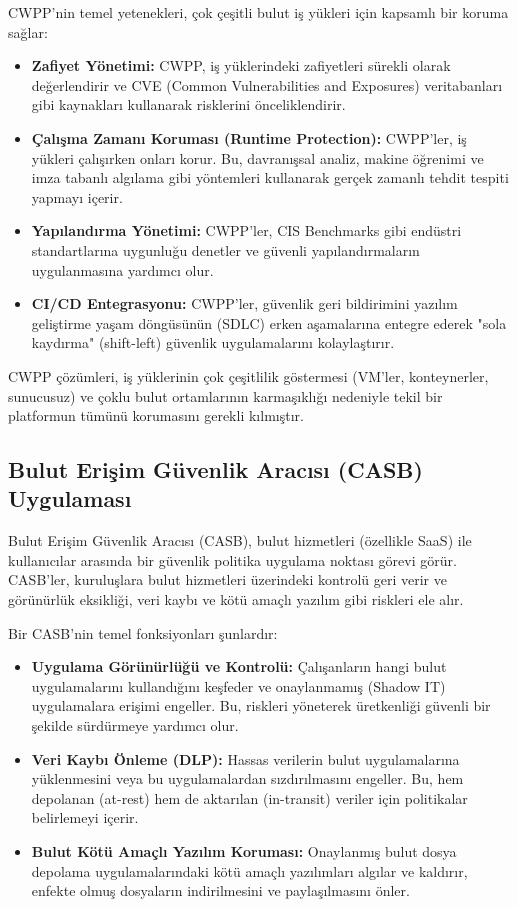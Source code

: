 CWPP'nin temel yetenekleri, çok çeşitli bulut iş yükleri için kapsamlı bir koruma sağlar:

\begin{itemize}
    \item \textbf{Zafiyet Yönetimi:} CWPP, iş yüklerindeki zafiyetleri sürekli olarak değerlendirir ve CVE (Common Vulnerabilities and Exposures) veritabanları gibi kaynakları kullanarak risklerini önceliklendirir.
    \item \textbf{Çalışma Zamanı Koruması (Runtime Protection):} CWPP'ler, iş yükleri çalışırken onları korur. Bu, davranışsal analiz, makine öğrenimi ve imza tabanlı algılama gibi yöntemleri kullanarak gerçek zamanlı tehdit tespiti yapmayı içerir.
    \item \textbf{Yapılandırma Yönetimi:} CWPP'ler, CIS Benchmarks gibi endüstri standartlarına uygunluğu denetler ve güvenli yapılandırmaların uygulanmasına yardımcı olur.
    \item \textbf{CI/CD Entegrasyonu:} CWPP'ler, güvenlik geri bildirimini yazılım geliştirme yaşam döngüsünün (SDLC) erken aşamalarına entegre ederek "sola kaydırma" (shift-left) güvenlik uygulamalarını kolaylaştırır.
\end{itemize}

CWPP çözümleri, iş yüklerinin çok çeşitlilik göstermesi (VM'ler, konteynerler, sunucusuz) ve çoklu bulut ortamlarının karmaşıklığı nedeniyle tekil bir platformun tümünü korumasını gerekli kılmıştır.

\subsection{Bulut Erişim Güvenlik Aracısı (CASB) Uygulaması}

Bulut Erişim Güvenlik Aracısı (CASB), bulut hizmetleri (özellikle SaaS) ile kullanıcılar arasında bir güvenlik politika uygulama noktası görevi görür. CASB'ler, kuruluşlara bulut hizmetleri üzerindeki kontrolü geri verir ve görünürlük eksikliği, veri kaybı ve kötü amaçlı yazılım gibi riskleri ele alır.

Bir CASB'nin temel fonksiyonları şunlardır:

\begin{itemize}
    \item \textbf{Uygulama Görünürlüğü ve Kontrolü:} Çalışanların hangi bulut uygulamalarını kullandığını keşfeder ve onaylanmamış (Shadow IT) uygulamalara erişimi engeller. Bu, riskleri yöneterek üretkenliği güvenli bir şekilde sürdürmeye yardımcı olur.
    \item \textbf{Veri Kaybı Önleme (DLP):} Hassas verilerin bulut uygulamalarına yüklenmesini veya bu uygulamalardan sızdırılmasını engeller. Bu, hem depolanan (at-rest) hem de aktarılan (in-transit) veriler için politikalar belirlemeyi içerir.
    \item \textbf{Bulut Kötü Amaçlı Yazılım Koruması:} Onaylanmış bulut dosya depolama uygulamalarındaki kötü amaçlı yazılımları algılar ve kaldırır, enfekte olmuş dosyaların indirilmesini ve paylaşılmasını önler.
\end{itemize}

